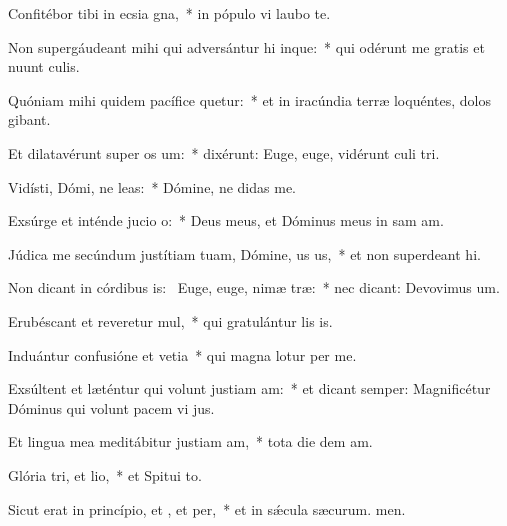 \item Confitébor tibi in ecsia gna,~* in pópulo vi laubo te.
\item Non supergáudeant mihi qui adversántur hi inque:~* qui odérunt me gratis et nuunt culis.
\item Quóniam mihi quidem pacífice quetur:~* et in iracúndia terræ loquéntes, dolos gibant.
\item Et dilatavérunt super  os um:~* dixérunt: Euge, euge, vidérunt culi tri.
\item Vidísti, Dómi, ne leas:~* Dómine, ne didas  me.
\item Exsúrge et inténde jucio o:~* Deus meus, et Dóminus meus in sam am.
\item Júdica me secúndum justítiam tuam, Dómine, us us,~* et non superdeant hi.
\item Non dicant in córdibus is:~\pscross{} Euge, euge, nimæ træ:~* nec dicant: Devovimus um.
\item Erubéscant et reveretur mul,~* qui gratulántur lis is.
\item Induántur confusióne et vetia~* qui magna lotur per me.
\item Exsúltent et læténtur qui volunt justiam am:~* et dicant semper: Magnificétur Dóminus qui volunt pacem vi jus.
\item Et lingua mea meditábitur justiam am,~* tota die dem am.
\item Glória tri, et lio,~* et Spitui to.
\item Sicut erat in princípio, et , et per,~* et in sǽcula sæcurum. men.
